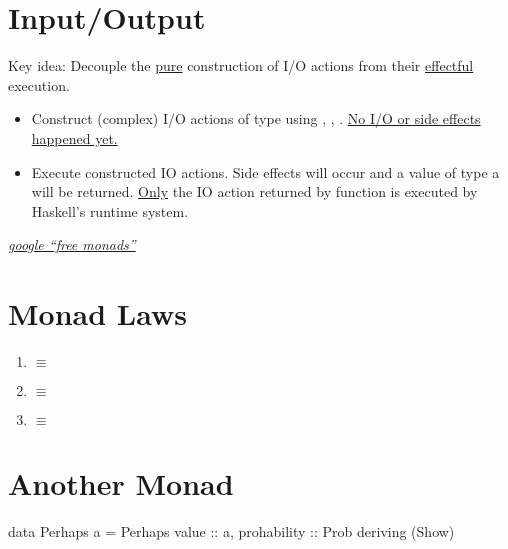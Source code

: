 \section{Input/Output}
Key idea: Decouple the \underline{pure} construction of I/O actions from their \underline{effectful} execution.
\begin{itemize}
    \item Construct (complex) I/O actions of type  using , , \codeline{>>=}. \underline{No I/O or side effects happened yet.}
    \item Execute constructed IO actions. Side effects will occur and a value of type a will be returned. \underline{Only} the IO action returned by function  is executed by Haskell's runtime system.
\end{itemize}


\vspace{9pt} 

\textit{\href{http://www.google.com/search?q=free+monads}{google ``free monads''}}

\newpage

\section{Monad Laws}

\begin{enumerate}
    \item {} $\equiv$ 
    \item {} $\equiv$ 
    \item {} $\equiv$ 
\end{enumerate}



\section{Another Monad}

\begin{codebox}[haskell]
data Perhaps a = Perhaps { value :: a, prohability :: Prob}
deriving (Show)
\end{codebox}

